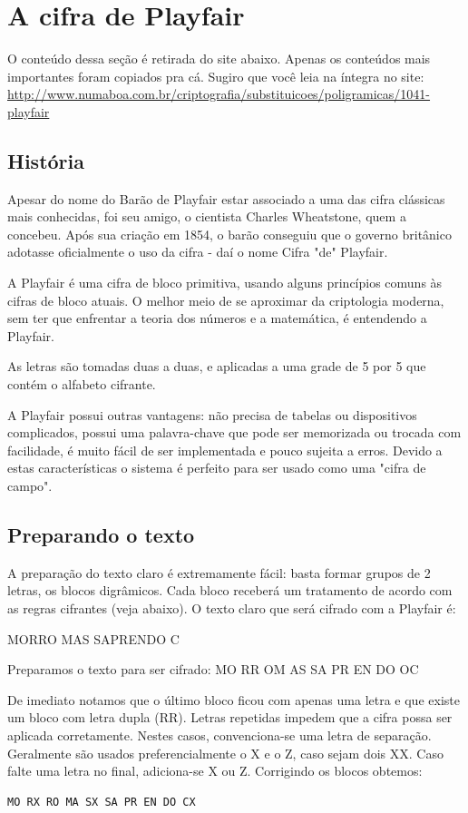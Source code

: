 \documentclass[12pt]{article}
\begin{document}
\section{A cifra de Playfair}

O conteúdo dessa seção é retirada do site abaixo. Apenas os conteúdos mais importantes foram copiados pra cá. Sugiro que você leia na íntegra no site:
\url{http://www.numaboa.com.br/criptografia/substituicoes/poligramicas/1041-playfair}

\subsection{História}

Apesar do nome do Barão de Playfair estar associado a uma das cifra clássicas mais conhecidas, foi seu amigo, o cientista Charles Wheatstone, quem a concebeu. Após sua criação em 1854, o barão conseguiu que o governo britânico adotasse oficialmente o uso da cifra - daí o nome Cifra "de" Playfair.

A Playfair é uma cifra de bloco primitiva, usando alguns princípios comuns às cifras de bloco atuais. O melhor meio de se aproximar da criptologia moderna, sem ter que enfrentar a teoria dos números e a matemática, é entendendo a Playfair.

As letras são tomadas duas a duas, e aplicadas a uma grade de 5 por 5 que contém o alfabeto cifrante.

A Playfair possui outras vantagens: não precisa de tabelas ou dispositivos complicados, possui uma palavra-chave que pode ser memorizada ou trocada com facilidade, é muito fácil de ser implementada e pouco sujeita a erros. Devido a estas características o sistema é perfeito para ser usado como uma "cifra de campo".

\subsection{Preparando o texto}


A preparação do texto claro é extremamente fácil: basta formar grupos de 2 letras, os blocos digrâmicos. Cada bloco receberá um tratamento de acordo com as regras cifrantes (veja abaixo). O texto claro que será cifrado com a Playfair é:

MORRO MAS SAPRENDO C 

Preparamos o texto para ser cifrado:
MO RR OM AS SA PR EN DO  OC

De imediato notamos que o último bloco ficou com apenas uma letra e que existe um bloco com letra dupla (RR). Letras repetidas impedem que a cifra possa ser aplicada corretamente. Nestes casos, convenciona-se uma letra de separação. Geralmente são usados preferencialmente o X e o Z, caso sejam dois XX. Caso falte uma letra no final, adiciona-se X ou Z. Corrigindo os blocos obtemos:
\begin{verbatim}
MO RX RO MA SX SA PR EN DO CX
\end{verbatim}
\end{document}
